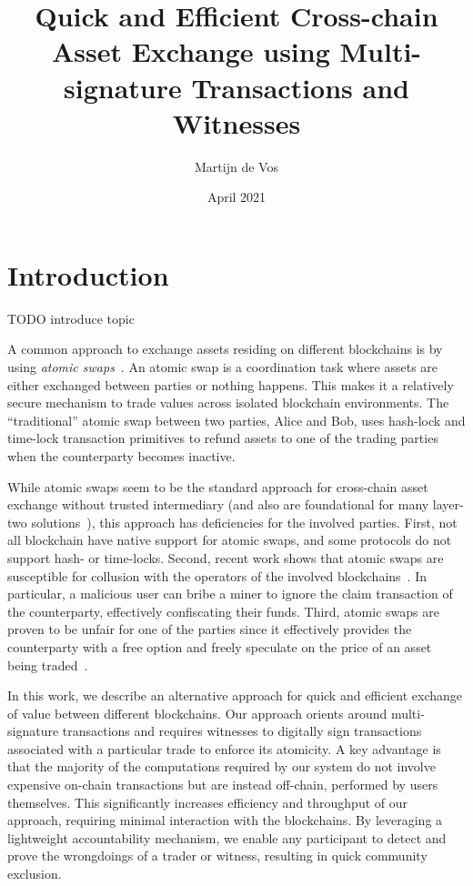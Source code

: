 \documentclass{article}
\title{Quick and Efficient Cross-chain Asset Exchange using Multi-signature Transactions and Witnesses}
\author{Martijn de Vos}
\date{April 2021}
\begin{document}
\maketitle

\section{Introduction}
TODO introduce topic

A common approach to exchange assets residing on different blockchains is by using \emph{atomic swaps}~\cite{herlihy2018atomic}.
An atomic swap is a coordination task where assets are either exchanged between parties or nothing happens.
This makes it a relatively secure mechanism to trade values across isolated blockchain environments.
The \enquote{traditional} atomic swap between two parties, Alice and Bob, uses hash-lock and time-lock transaction primitives to refund assets to one of the trading parties when the counterparty becomes inactive.

While atomic swaps seem to be the standard approach for cross-chain asset exchange without trusted intermediary (and also are foundational for many layer-two solutions~\cite{gudgeon2019sok}), this approach has deficiencies for the involved parties.
First, not all blockchain have native support for atomic swaps, and some protocols do not support hash- or time-locks.
Second, recent work shows that atomic swaps are susceptible for collusion with the operators of the involved blockchains~\cite{tsabary2020mad}.
In particular, a malicious user can bribe a miner to ignore the claim transaction of the counterparty, effectively confiscating their funds.
Third, atomic swaps are proven to be unfair for one of the parties since it effectively provides the counterparty with a free option and freely speculate on the price of an asset being traded~\cite{han2019optionality}.

In this work, we describe an alternative approach for quick and efficient exchange of value between different blockchains.
Our approach orients around multi-signature transactions and requires witnesses to digitally sign transactions associated with a particular trade to enforce its atomicity.
A key advantage is that the majority of the computations required by our system do not involve expensive on-chain transactions but are instead off-chain, performed by users themselves.
This significantly increases efficiency and throughput of our approach, requiring minimal interaction with the blockchains.
By leveraging a lightweight accountability mechanism, we enable any participant to detect and prove the wrongdoings of a trader or witness, resulting in quick community exclusion.
\end{document}
